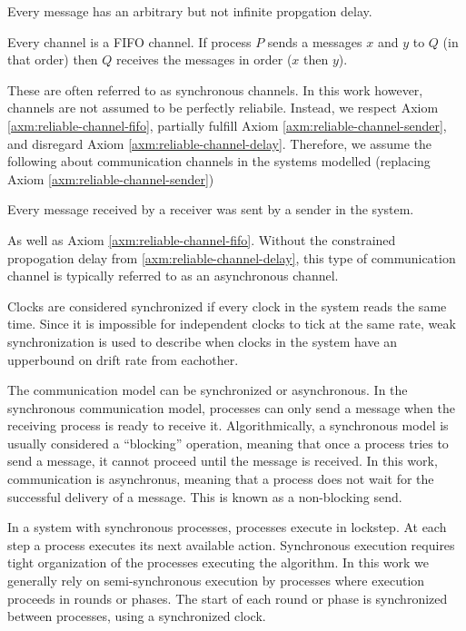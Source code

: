\begin{axm}
    \label{axm:reliable-channel-delay}
    Every message has an arbitrary but not infinite propgation delay.\cite{DISTRIBUTED}
\end{axm}

\begin{axm}
    \label{axm:reliable-channel-fifo}
    Every channel is a \ac{FIFO} channel. If process $P$ sends a messages $x$ and $y$ to $Q$ (in that order) then $Q$ receives the messages in order ($x$ then $y$).\cite{DISTRIBUTED}
\end{axm}

These are often referred to as synchronous channels.
In this work however, channels are not assumed to be perfectly reliabile.
Instead, we respect Axiom \ref{axm:reliable-channel-fifo}, partially fulfill Axiom \ref{axm:reliable-channel-sender}, and disregard Axiom \ref{axm:reliable-channel-delay}.
Therefore, we assume the following about communication channels in the systems modelled (replacing Axiom \ref{axm:reliable-channel-sender})

\begin{axm}
    Every message received by a receiver was sent by a sender in the system.
\end{axm}

As well as Axiom \ref{axm:reliable-channel-fifo}.
Without the constrained propogation delay from \ref{axm:reliable-channel-delay}, this type of communication channel is typically referred to as an asynchronous channel.

Clocks are considered synchronized if every clock in the system reads the same time.
Since it is impossible for independent clocks to tick at the same rate, weak synchronization is used to describe when clocks in the system have an upperbound on drift rate from eachother.

The communication model can be synchronized or asynchronous.
In the synchronous communication model, processes can only send a message when the receiving process is ready to receive it.
Algorithmically, a synchronous model is usually considered a ``blocking'' operation, meaning that once a process tries to send a message, it cannot proceed until the message is received.
In this work, communication is asynchronus, meaning that a process does not wait for the successful delivery of a message.
This is known as a non-blocking send.

In a system with synchronous processes, processes execute in lockstep.
At each step a process executes its next available action.
Synchronous execution requires tight organization of the processes executing the algorithm.
In this work we generally rely on semi-synchronous execution by processes where execution proceeds in rounds or phases.
The start of each round or phase is synchronized between processes, using a synchronized clock.

